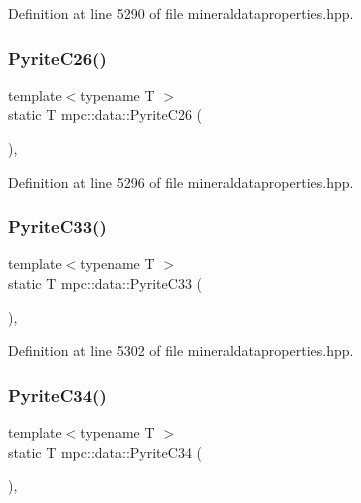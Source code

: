 Definition at line 5290 of file mineraldataproperties.\+hpp.

\mbox{\label{namespacempc_1_1data_a1adf08e668a71a8153265894bc694d2a}} 
\subsubsection{\texorpdfstring{Pyrite\+C26()}{PyriteC26()}}
{\footnotesize\ttfamily template$<$typename T $>$ \\
static T mpc\+::data\+::\+Pyrite\+C26 (\begin{DoxyParamCaption}{ }\end{DoxyParamCaption})\hspace{0.3cm}{\ttfamily [inline]}, {\ttfamily [static]}}



Definition at line 5296 of file mineraldataproperties.\+hpp.

\mbox{\label{namespacempc_1_1data_aa3a0ad6fceed6c0f6b17c7fe16509cdf}} 
\subsubsection{\texorpdfstring{Pyrite\+C33()}{PyriteC33()}}
{\footnotesize\ttfamily template$<$typename T $>$ \\
static T mpc\+::data\+::\+Pyrite\+C33 (\begin{DoxyParamCaption}{ }\end{DoxyParamCaption})\hspace{0.3cm}{\ttfamily [inline]}, {\ttfamily [static]}}



Definition at line 5302 of file mineraldataproperties.\+hpp.

\mbox{\label{namespacempc_1_1data_a8c169a418835af72e80eafff06c1ad49}} 
\subsubsection{\texorpdfstring{Pyrite\+C34()}{PyriteC34()}}
{\footnotesize\ttfamily template$<$typename T $>$ \\
static T mpc\+::data\+::\+Pyrite\+C34 (\begin{DoxyParamCaption}{ }\end{DoxyParamCaption})\hspace{0.3cm}{\ttfamily [inline]}, {\ttfamily [static]}}



